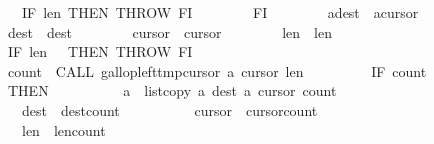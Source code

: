 \begin{isabellebody}
\ \ \ \ \ \ \ \ \ \ IF\ {\isasymacute}len{}{\isasymle}{}\ THEN\ THROW\ FI\isanewline
\ \ \ \ \ \ \ \ FI{\isacharsemicolon}{\isacharsemicolon}\isanewline
\ \ \ \ \ \ \ \ {\isasymacute}a{\isacharbang}{\isasymacute}dest\ {\isacharcolon}{\isacharequal}{\isacharequal}\ {\isasymacute}a{\isacharbang}{\isasymacute}cursor{}{\isacharsemicolon}{\isacharsemicolon}\isanewline
\ \ \ \ \ \ \ \ {\isasymacute}dest\ {\isacharcolon}{\isacharequal}{\isacharequal}\ {\isasymacute}dest{\isacharplus}{}{\isacharsemicolon}{\isacharsemicolon}\isanewline
\ \ \ \ \ \ \ \ {\isasymacute}cursor{}\ {\isacharcolon}{\isacharequal}{\isacharequal}\ {\isasymacute}cursor{}{\isacharplus}{}{\isacharsemicolon}{\isacharsemicolon}\isanewline
\ \ \ \ \ \ \ \ {\isasymacute}len{}\ {\isacharcolon}{\isacharequal}{\isacharequal}\ {\isasymacute}len{}{\isacharminus}{}{\isacharsemicolon}{\isacharsemicolon}\isanewline
\ \ \ \ \ \ \ \ IF\ {\isasymacute}len{}\ {\isacharequal}\ {}\ THEN\ THROW\ FI{\isacharsemicolon}{\isacharsemicolon}\isanewline
\isanewline
\ \ \ \ \ \ \ \ {\isasymacute}count{}\ {\isacharcolon}{\isacharequal}{\isacharequal}\ CALL\ gallop{\isacharunderscore}left{\isacharparenleft}{\isasymacute}tmp{\isacharbang}{\isasymacute}cursor{}{\isacharcomma}\ {\isasymacute}a{\isacharcomma}\ {\isasymacute}cursor{}{\isacharcomma}\ {\isasymacute}len{}{\isacharcomma}\ {}{\isacharparenright}{\isacharsemicolon}{\isacharsemicolon}\isanewline
\ \ \ \ \ \ \ \ IF\ {\isasymacute}count{}\ {\isasymnoteq}\ {}\isanewline
\ \ \ \ \ \ \ \ THEN\isanewline
\ \ \ \ \ \ \ \ \ \ {\isasymacute}a\ {\isacharcolon}{\isacharequal}{\isacharequal}\ list{\isacharunderscore}copy\ {\isasymacute}a\ {\isasymacute}dest\ {\isasymacute}a\ {\isasymacute}cursor{}\ {\isasymacute}count{}{\isacharsemicolon}{\isacharsemicolon}\isanewline
\ \ \ \ \ \ \ \ \ \ {\isasymacute}dest\ {\isacharcolon}{\isacharequal}{\isacharequal}\ {\isasymacute}dest{\isacharplus}{\isasymacute}count{}{\isacharsemicolon}{\isacharsemicolon}\isanewline
\ \ \ \ \ \ \ \ \ \ {\isasymacute}cursor{}\ {\isacharcolon}{\isacharequal}{\isacharequal}\ {\isasymacute}cursor{}{\isacharplus}{\isasymacute}count{}{\isacharsemicolon}{\isacharsemicolon}\isanewline
\ \ \ \ \ \ \ \ \ \ {\isasymacute}len{}\ {\isacharcolon}{\isacharequal}{\isacharequal}\ {\isasymacute}len{}{\isacharminus}{\isasymacute}count{}{\isacharsemicolon}{\isacharsemicolon}\isanewline

\end{isabellebody}
